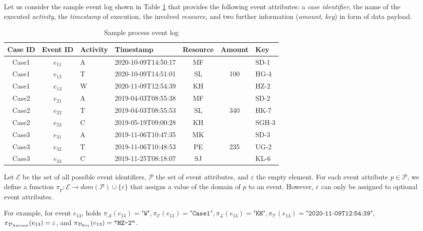 \documentclass[runningheads]{llncs}
\begin{document}
Let us consider the sample event log shown in Table \ref{sample-log} that provides the following event attributes: a \textit{case identifier}, the name of the executed \textit{activity}, the \textit{timestamp} of execution, the involved \textit{resource}, and two further information (\textit{amount}, \textit{key}) in form of data payload.

\begin{table}[t]
		\setlength{\belowcaptionskip}{-18pt}
	\begin{tabularx}{\textwidth}{ccXlccX}
		\toprule
		\textbf{Case ID}	& \textbf{Event ID} & \textbf{Activity}  & \textbf{Timestamp}  			& \textbf{Resource}  & \textbf{Amount}  	& \textbf{Key}  \\ \midrule
		Case1	&$e_{11}$	& A 		& 2020-10-09T14:50:17 	& MF 		&  			& SD-1 \\ 
		Case1	&$e_{12}$		& T 		& 2020-10-09T14:51:01 	& SL 		& 100 		& HG-4 \\ 
		Case1	&$e_{13}$	& W 		& 2020-11-09T12:54:39 	& KH 		&  			& HZ-2 \\ \hline
		Case2	&$e_{21}$	& A 		& 2019-04-03T08:55:38 	& MF 		&  			& SD-2 \\ 
		Case2	&$e_{22}$		& T 		& 2019-04-03T08:55:53 	& SL  		& 340 		& HK-7 \\  
		Case2	&$e_{23}$		& C 		& 2019-05-19T09:00:28 	& KH 		&  			& SGH-3 \\ \hline 
		Case3	&$e_{31}$		& A 		& 2019-11-06T10:47:35 	& MK 		&  			& SD-3  \\ 
		Case3	&$e_{32}$		& T 		& 2019-11-06T10:48:53 	& PE 		& 235 		& UG-2 \\  
		Case3	&$e_{33}$		& C 		& 2019-11-25T08:18:07 	& SJ 		&  			& KL-6 \\ \bottomrule
		
	\end{tabularx}
	\caption{Sample process event log}
	\label{sample-log}
\end{table}

\begin{definition}
	Let $\mathcal{E}$ be the set of all possible event identifiers, $\mathcal{P}$ the set of event attributes, and $\varepsilon$ the empty element. For each event attribute $p \in \mathcal{P}$, we define a function $\pi_p: \mathcal{E} \rightarrow dom\left(\mathcal{P}\right) \cup \{\varepsilon\}$ that assigns a value of the domain of $p$ to an event. However, $\varepsilon$ can only be assigned to optional event attributes.
\end{definition}
For example, for event $e_{13}$, holds $\pi_{\mathcal{A}}(e_{13}) = \texttt{"W"}, \pi_{\mathcal{C}}(e_{13}) = \texttt{"Case1"}, \pi_{\mathcal{L}}(e_{13}) = \texttt{"KH"}, \pi_{\mathcal{T}}(e_{13}) =\texttt{"2020-11-09T12:54:39"}$, $\pi_{\mathcal{D}_{\textnormal{Amount}}}(e_{13}) = \varepsilon$, and $\pi_{\mathcal{D}_{\textnormal{Key}}}(e_{13}) = \texttt{"HZ-2"}$.
\end{document}
